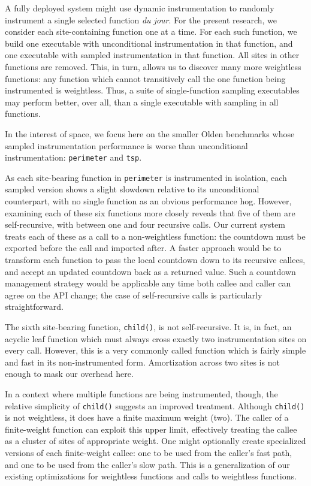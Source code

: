 A fully deployed system might use dynamic instrumentation to randomly
instrument a single selected function \textit{du jour}.  For the
present research, we consider each site-containing function one at a
time.  For each such function, we build one executable with
unconditional instrumentation in that function, and one executable
with sampled instrumentation in that function.  All sites in other
functions are removed.  This, in turn, allows us to discover many more
weightless functions: any function which cannot transitively call the
one function being instrumented is weightless.  Thus, a suite of
single-function sampling executables may perform better, over all,
than a single executable with sampling in all functions.

In the interest of space, we focus here on the smaller Olden
benchmarks whose sampled instrumentation performance is worse than
unconditional instrumentation: \texttt{perimeter} and \texttt{tsp}.

As each site-bearing function in \texttt{perimeter} is instrumented in
isolation, each sampled version shows a slight slowdown relative to
its unconditional counterpart, with no single function as an obvious
performance hog.  However, examining each of these six functions more
closely reveals that five of them are self-recursive, with between one
and four recursive calls.  Our current system treats each of these as
a call to a non-weightless function: the countdown must be exported
before the call and imported after.  A faster approach would be to
transform each function to pass the local countdown down to its
recursive callees, and accept an updated countdown back as a returned
value.  Such a countdown management strategy would be applicable any
time both callee and caller can agree on the API change; the case of
self-recursive calls is particularly straightforward.

The sixth site-bearing function, \texttt{child()}, is not
self-recursive.  It is, in fact, an acyclic leaf function which must
always cross exactly two instrumentation sites on every call.
However, this is a very commonly called function which is fairly
simple and fast in its non-instrumented form.  Amortization across two
sites is not enough to mask our overhead here.

In a context where multiple functions are being instrumented, though,
the relative simplicity of \texttt{child()} suggests an improved
treatment.  Although \texttt{child()} is not weightless, it does have
a finite maximum weight (two).  The caller of a finite-weight function
can exploit this upper limit, effectively treating the callee as a
cluster of sites of appropriate weight.  One might optionally create
specialized versions of each finite-weight callee: one to be used from
the caller's fast path, and one to be used from the caller's slow
path.  This is a generalization of our existing optimizations for
weightless functions and calls to weightless functions.

